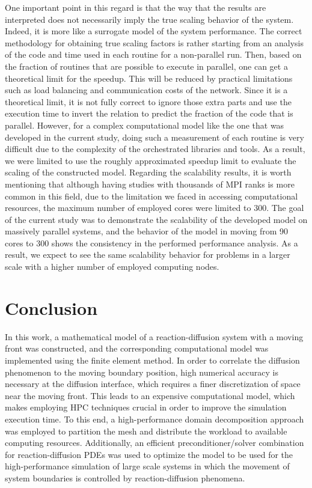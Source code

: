 One important point in this regard is that the way that the results are interpreted does not necessarily imply the true scaling behavior of the system. Indeed, it is more like a surrogate model of the system performance. The correct methodology for obtaining true scaling factors is rather starting from an analysis of the code and time used in each routine for a non-parallel run. Then, based on the fraction of routines that are possible to execute in parallel, one can get a theoretical limit for the speedup. This will be reduced by practical limitations such as load balancing and communication costs of the network. Since it is a theoretical limit, it is not fully correct to ignore those extra parts and use the execution time to invert the relation to predict the fraction of the code that is parallel. However, for a complex computational model like the one that was developed in the current study, doing such a measurement of each routine is very difficult due to the complexity of the orchestrated libraries and tools. As a result, we were limited to use the roughly approximated speedup limit to evaluate the scaling of the constructed model. Regarding the scalability results, it is worth mentioning that although having studies with thousands of {MPI} ranks is more common in this field, due to the limitation we faced in accessing computational resources, the maximum number of employed cores were limited to 300. The goal of the current study was to demonstrate the scalability of the developed model on massively parallel systems, and the behavior of the model in moving from 90 cores to 300 shows the consistency in the performed performance analysis. As a result, we expect to see the same scalability behavior for problems in a larger scale with a higher number of employed computing nodes.



\section{Conclusion}

In this work, a mathematical model of a reaction-diffusion system with a moving front was constructed, and the corresponding computational model was implemented using the finite element method. In order to correlate the diffusion phenomenon to the moving boundary position, high numerical accuracy is necessary at the diffusion interface, which requires a finer discretization of space near the moving front. This leads to an expensive computational model, which makes employing {HPC} techniques crucial in order to improve the simulation execution time. To this end, a high-performance domain decomposition approach was employed to partition the mesh and distribute the workload to available computing resources. Additionally, an efficient preconditioner/solver combination for reaction-diffusion {PDE}s was used to optimize the model to be used for the high-performance simulation of large scale systems in which the movement of system boundaries is controlled by reaction-diffusion phenomena.

